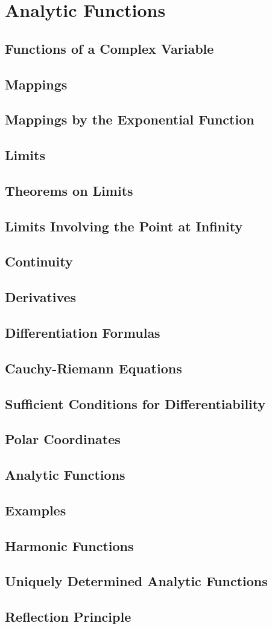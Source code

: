 \documentclass{book}
\theoremstyle{definition}
\begin{document}
\newpage



\chapter{Analytic Functions}

\section{Functions of a Complex Variable}
\section{Mappings}
\section{Mappings by the Exponential Function}
\section{Limits}
\section{Theorems on Limits}
\section{Limits Involving the Point at Infinity}
\section{Continuity}
\section{Derivatives}
\section{Differentiation Formulas}
\section{Cauchy-Riemann Equations}
\section{Sufficient Conditions for Differentiability}
\section{Polar Coordinates}
\section{Analytic Functions}
\section{Examples}
\section{Harmonic Functions}
\section{Uniquely Determined Analytic Functions}
\section{Reflection Principle}


\newpage
\end{document}
